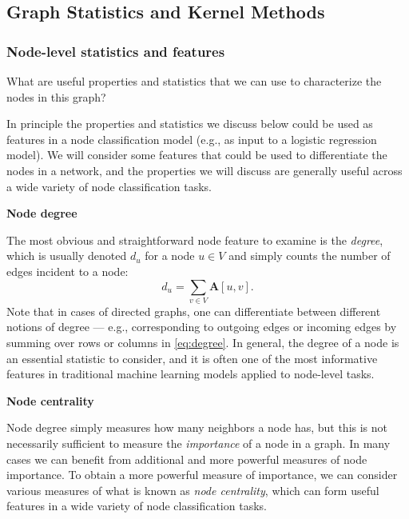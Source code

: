 \documentclass[10pt]{book}
\let\defaultmarginpar\marginpar
\renewcommand\marginpar[2][]{\defaultmarginpar{\itshape\color{gray}#2}}
\begin{document}
\subsection{Graph Statistics and Kernel Methods}

\subsubsection{Node-level statistics and features}

What are useful properties and statistics that we can use to characterize the nodes in this graph?

In principle the properties and statistics we discuss below could be used as features in a node classification model (e.g., as input to a logistic regression model). We will consider some features that could be used to differentiate the nodes in a network, and the properties we will discuss are generally useful across a wide variety of node classification tasks.
\smallskip

\textbf{Node degree}

The most obvious and straightforward node feature to examine is the \emph{degree}\marginpar{degree}, which is usually denoted $d_u$ for a node $u \in V$ and simply counts the number of edges incident to a node:
\begin{equation}
    d_u = \sum_{v \in V} \mathbf A[u, v].
    \label{eq:degree}
\end{equation}
Note that in cases of directed graphs, one can differentiate between different notions of degree --- e.g., corresponding to outgoing edges or incoming edges by summing over rows or columns in \autoref{eq:degree}. In general, the degree of a node is an essential statistic to consider, and it is often one of the most informative features in traditional machine learning models applied to node-level tasks.
\smallskip

\textbf{Node centrality}

Node degree simply measures how many neighbors a node has, but this is not necessarily sufficient to measure the \emph{importance} of a node in a graph. In many cases we can benefit from additional and more powerful measures of node importance. To obtain a more powerful measure of importance, we can consider various measures of what is known as \emph{node centrality}\marginpar{node centrality}, which can form useful features in a wide variety of node classification tasks.
\end{document}
